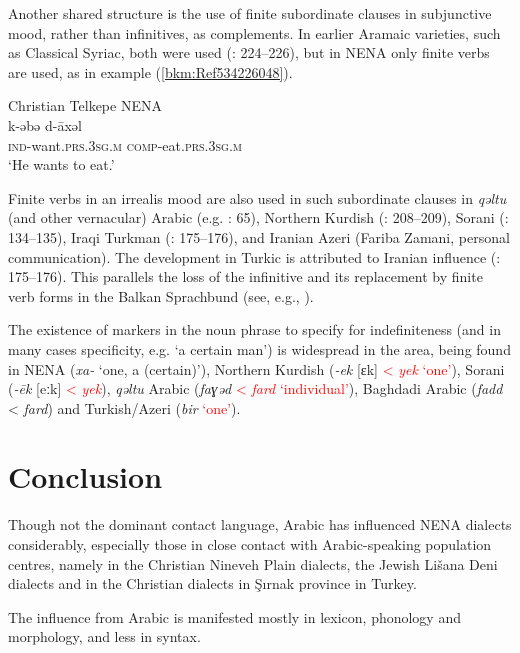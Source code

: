 \documentclass[output=paper]{langsci/langscibook}
\begin{document}
Another shared structure is the use of finite subordinate clauses in subjunctive mood, rather than infinitives, as complements. In earlier Aramaic varieties, such as Classical Syriac, both were used (\citealt{Nöldeke1904Syriac}: 224–226), but in NENA only finite verbs are used, as in example (\ref{bkm:Ref534226048}).

\ea\label{bkm:Ref534226048}Christian Telkepe NENA\\
\gll k-əbə       d-āxəl\\
    \textsc{ind-}\textup{want.}\textsc{prs}.\textsc{3sg.m} \textsc{comp}\textup{{}-eat.}\textsc{prs}.\textsc{3sg.m}\\
\glt ‘He wants to eat.’\z

Finite verbs in an irrealis mood are also used in such subordinate clauses in \textit{qəltu} (and other vernacular) Arabic (e.g. \citealt{Jastrow1990book}: 65), Northern Kurdish (\citealt{MacKenzie1961}: 208–209), Sorani (\citealt{MacKenzie1961}: 134–135), Iraqi Turkman (\citealt{Bulut2007}: 175–176), and Iranian Azeri (Fariba Zamani, personal communication). The development in Turkic is attributed to Iranian influence (\citealt{Bulut2007}: 175–176). This parallels the loss of the infinitive and its replacement by finite verb forms in the Balkan Sprachbund (see, e.g., \citealt{Joseph2009}).

The existence of markers in the noun phrase to specify for indefiniteness (and in many cases specificity, e.g. ‘a certain man’) is widespread in the area, being found in NENA (\textit{xa-} ‘one, a (certain)’), Northern Kurdish (\textit{\nobreakdash-ek} [ɛk] \textcolor{red}{< \textit{yek} `one'}), Sorani (\textit{\nobreakdash-ēk} [eːk] \textcolor{red}{< \textit{yek}}), \textit{qəltu} Arabic (\textit{faɣəd} \textcolor{red}{< \textit{fard} `individual'}), Baghdadi Arabic (\textit{fadd} < \textit{fard}) and Turkish/Azeri (\textit{bir} \textcolor{red}{`one'}).


\section{Conclusion}

Though not the dominant contact language, Arabic has influenced NENA dialects considerably, especially those in close contact with Arabic-speaking population centres, namely in the Christian Nineveh Plain dialects, the Jewish Lišana Deni dialects and in the Christian dialects in Şırnak province in Turkey.

The influence from Arabic is manifested mostly in lexicon, phonology and morphology, and less in syntax.
\end{document}
